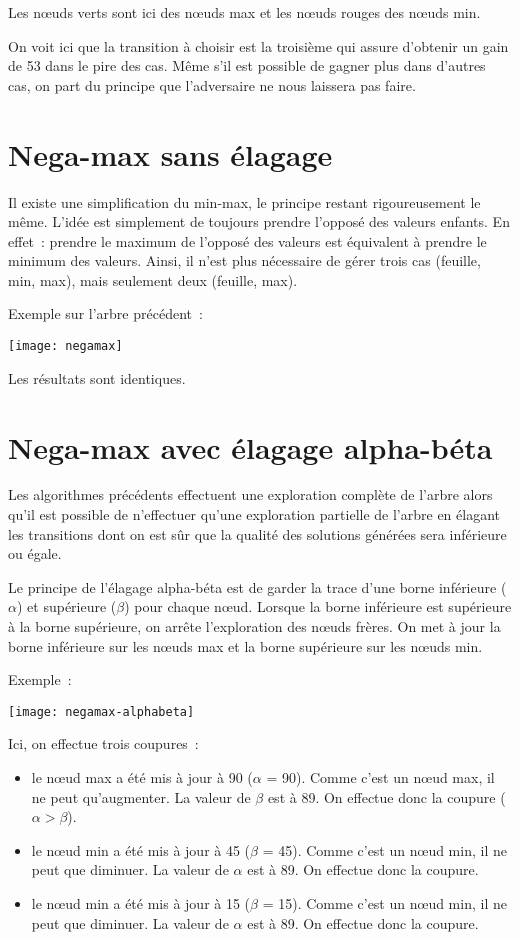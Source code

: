 Les nœuds verts sont ici des nœuds max et les nœuds rouges des nœuds min.

On voit ici que la transition à choisir est la troisième qui assure d'obtenir un gain de 53 dans le pire des cas.
Même s'il est possible de gagner plus dans d'autres cas, on part du principe que l'adversaire ne nous laissera pas faire.

\section{Nega-max sans élagage}

Il existe une simplification du min-max, le principe restant rigoureusement le même.
L'idée est simplement de toujours prendre l'opposé des valeurs enfants.
En effet : prendre le maximum de l'opposé des valeurs est équivalent à prendre le minimum des valeurs.
Ainsi, il n'est plus nécessaire de gérer trois cas (feuille, min, max), mais seulement deux (feuille, max).

Exemple sur l'arbre précédent :

\texttt{[image: negamax]}

Les résultats sont identiques.

\section{Nega-max avec élagage alpha-béta}

Les algorithmes précédents effectuent une exploration complète de l'arbre alors qu'il est possible de n'effectuer
qu'une exploration partielle de l'arbre en élagant les transitions dont on est sûr que la qualité des solutions générées
sera inférieure ou égale.

Le principe de l'élagage alpha-béta est de garder la trace d'une borne inférieure (\(\alpha\)) et supérieure (\(\beta\))
pour chaque nœud. Lorsque la borne inférieure est supérieure à la borne supérieure, on arrête l'exploration des nœuds frères.
On met à jour la borne inférieure sur les nœuds max et la borne supérieure sur les nœuds min.

Exemple :

\texttt{[image: negamax-alphabeta]}

Ici, on effectue trois coupures :
\begin{itemize}
    \item le nœud max a été mis à jour à 90 (\(\alpha\) = 90). Comme c'est un nœud max, il ne peut qu'augmenter.
        La valeur de \(\beta\) est à 89. On effectue donc la coupure (\(\alpha > \beta\)).
    \item le nœud min a été mis à jour à 45 (\(\beta\) = 45). Comme c'est un nœud min, il ne peut que diminuer.
        La valeur de \(\alpha\) est à 89. On effectue donc la coupure.
    \item le nœud min a été mis à jour à 15 (\(\beta\) = 15). Comme c'est un nœud min, il ne peut que diminuer.
        La valeur de \(\alpha\) est à 89. On effectue donc la coupure.
\end{itemize}

